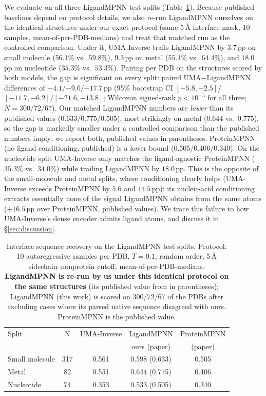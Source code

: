 \documentclass[11pt,letterpaper]{article}
\begin{document}
We evaluate on all three LigandMPNN test splits (Table~\ref{tab:iface}). Because published baselines
depend on protocol details, we also re-run LigandMPNN ourselves on the identical structures under our
exact protocol (same $5$\,{\AA} interface mask, $10$ samples, mean-of-per-PDB-medians) and treat that
matched run as the controlled comparison. Under it, UMA-Inverse trails LigandMPNN by $3.7$\,pp on
small molecule ($56.1\%$ vs.\ $59.8\%$), $9.3$\,pp on metal ($55.1\%$ vs.\ $64.4\%$), and $18.0$\,pp on
nucleotide ($35.3\%$ vs.\ $53.3\%$). Pairing per PDB on the structures scored by both models, the gap
is significant on every split: paired UMA$-$LigandMPNN differences of $-4.1$/$-9.0$/$-17.7$\,pp
(95\% bootstrap CI $[-5.8,-2.5]$/$[-11.7,-6.2]$/$[-21.6,-13.8]$; Wilcoxon signed-rank
$p<10^{-5}$ for all three; $N{=}300$/$72$/$67$). Our matched LigandMPNN numbers are
\emph{lower} than its published values ($0.633$/$0.775$/$0.505$), most strikingly on metal ($0.644$
vs.\ $0.775$), so the gap is markedly smaller under a controlled comparison than the published numbers
imply; we report both, published values in parentheses. ProteinMPNN (no ligand conditioning, published)
is a lower bound ($0.505$/$0.406$/$0.340$). On the nucleotide split UMA-Inverse only
matches the ligand-agnostic ProteinMPNN ($35.3\%$ vs.\ $34.0\%$) while trailing LigandMPNN by
$18.0$\,pp. This is the opposite of the small-molecule and metal splits, where conditioning clearly
helps (UMA-Inverse exceeds ProteinMPNN by $5.6$ and $14.5$\,pp): its nucleic-acid conditioning
extracts essentially none of the signal LigandMPNN obtains from the same atoms ($+16.5$\,pp over
ProteinMPNN, published values). We trace this failure to how UMA-Inverse's
dense encoder admits ligand atoms, and discuss it in \S\ref{sec:discussion}.

\begin{table}[h]
\centering
\caption{Interface sequence recovery on the LigandMPNN test splits. Protocol: 10 autoregressive
  samples per PDB, $T{=}0.1$, random order, 5\,{\AA} sidechain--nonprotein cutoff; mean-of-per-PDB-medians.
  \textbf{LigandMPNN is re-run by us under this identical protocol on the same structures} (its
  published value from \citet{dauparas2025ligandmpnn} in parentheses); LigandMPNN (this work) is scored on
  $300$/$72$/$67$ of the PDBs after excluding cases where its parsed native sequence disagreed with
  ours. ProteinMPNN is the published value.}
\label{tab:iface}
\begin{tabular}{lcccc}
\toprule
Split & N & UMA-Inverse & LigandMPNN & ProteinMPNN \\
               &     &             & ours (paper) & (paper) \\
\midrule
Small molecule & 317 & 0.561 & 0.598 (0.633) & 0.505 \\
Metal          & 82  & 0.551 & 0.644 (0.775) & 0.406 \\
Nucleotide     & 74  & 0.353 & 0.533 (0.505) & 0.340 \\
\bottomrule
\end{tabular}
\end{table}
\end{document}
